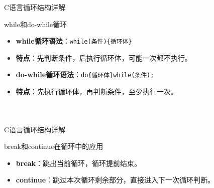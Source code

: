 \documentclass[UTF8,aspectratio=169]{beamer}
\begin{document}
\begin{frame}{C语言循环结构详解}
    \begin{ytublock}{while和do-while循环}
        \begin{itemize}
            \item \textbf{while循环语法}：\texttt{while(条件)\{循环体\}}
            \item \textbf{特点}：先判断条件，后执行循环体，可能一次都不执行。
            \item \textbf{do-while循环语法}：\texttt{do\{循环体\}while(条件);}
            \item \textbf{特点}：先执行循环体，再判断条件，至少执行一次。
        \end{itemize}
    \end{ytublock}
    \begin{columns}
        \begin{column}{0.48\textwidth}
            \inputminted[firstline=51,lastline=58]{cpp}{code/c_control_structures.c}
        \end{column}
        \begin{column}{0.48\textwidth}
            \inputminted[firstline=60,lastline=67]{cpp}{code/c_control_structures.c}
        \end{column}
    \end{columns}
\end{frame}

\begin{frame}{C语言循环结构详解}
    \begin{ytublock}{break和continue在循环中的应用}
        \begin{itemize}
            \item \textbf{break}：跳出当前循环，循环提前结束。
            \item \textbf{continue}：跳过本次循环剩余部分，直接进入下一次循环判断。
        \end{itemize}
    \end{ytublock}
    \inputminted[firstline=69,lastline=80]{cpp}{code/c_control_structures.c}
\end{frame}
\end{document}
